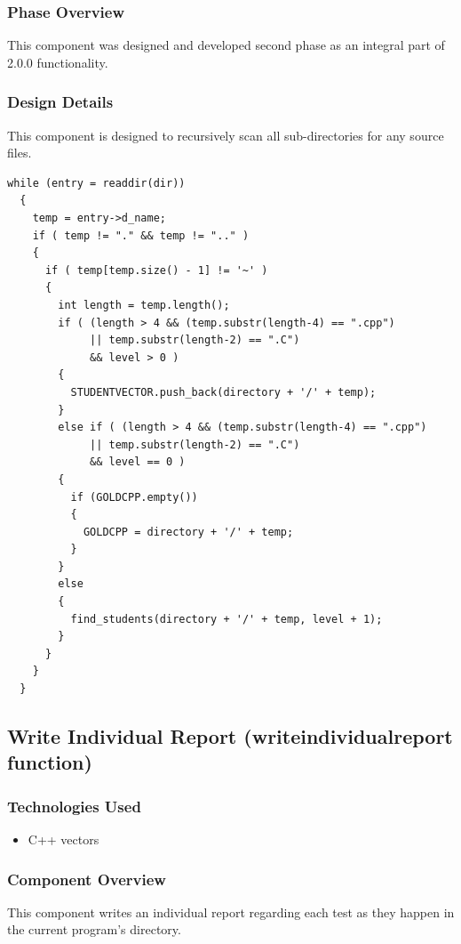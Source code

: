 \documentclass {article}
\begin{document}
			\subsubsection{\large{\color{cyan}Phase Overview}}
				This component was designed and developed second phase as an integral part of
				 2.0.0 functionality.

			\subsubsection{\large{\color{cyan}Design Details}}
				This component is designed to recursively scan all sub-directories for any source
				 files.
				 
\begin{lstlisting}
while (entry = readdir(dir)) 
  {
    temp = entry->d_name;
    if ( temp != "." && temp != ".." )
    {
      if ( temp[temp.size() - 1] != '~' )
      {
        int length = temp.length();
        if ( (length > 4 && (temp.substr(length-4) == ".cpp")
             || temp.substr(length-2) == ".C")
             && level > 0 )
        {
          STUDENTVECTOR.push_back(directory + '/' + temp);
        }
        else if ( (length > 4 && (temp.substr(length-4) == ".cpp")
             || temp.substr(length-2) == ".C")
             && level == 0 )
        {
          if (GOLDCPP.empty())
          {
            GOLDCPP = directory + '/' + temp;
          }
        }
        else
        {
          find_students(directory + '/' + temp, level + 1);
        }
      }
    }
  }
\end{lstlisting}

		\subsection{\Large{\color{blue}Write Individual Report (writeindividualreport function)}}

			\subsubsection{\large{\color{cyan}Technologies  Used}}
				\begin{itemize}
					\item C++ vectors
				\end{itemize}

			\subsubsection{\large{\color{cyan}Component Overview}}
				This component writes an individual report regarding each test as they happen in
				 the current program's directory.
\end{document}
